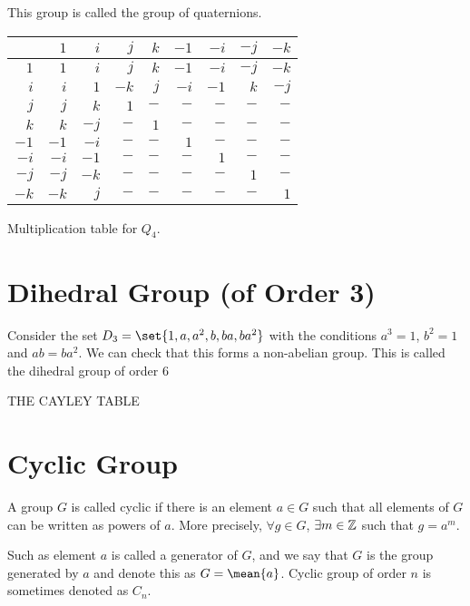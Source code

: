\documentclass[11pt]{penrose}
\newcommand{\cyclic}[1]{\mean{#1}}
\newcommand{\missing}[1]{{\color{red}#1}}
\begin{document}
This group is called the group of quaternions.
\begin{center}
    \begin{tabularx}{0.62\textwidth}{|R|R|R|R|R|R|R|R|R|}
        \hline
             & $ 1$ & $ i$ & $ j$ & $ k$ & $-1$ & $-i$ & $-j$ & $-k$ \\ \hline
        $ 1$ & $ 1$ & $ i$ & $ j$ & $ k$ & $-1$ & $-i$ & $-j$ & $-k$ \\ \hline
        $ i$ & $ i$ & $ 1$ & $-k$ & $ j$ & $-i$ & $-1$ & $ k$ & $-j$ \\ \hline
        $ j$ & $ j$ & $ k$ & $ 1$ & $ -$ & $ -$ & $ -$ & $ -$ & $ -$ \\ \hline
        $ k$ & $ k$ & $-j$ & $ -$ & $ 1$ & $ -$ & $ -$ & $ -$ & $ -$ \\ \hline
        $-1$ & $-1$ & $-i$ & $ -$ & $ -$ & $ 1$ & $ -$ & $ -$ & $ -$ \\ \hline
        $-i$ & $-i$ & $-1$ & $ -$ & $ -$ & $ -$ & $ 1$ & $ -$ & $ -$ \\ \hline
        $-j$ & $-j$ & $-k$ & $ -$ & $ -$ & $ -$ & $ -$ & $ 1$ & $ -$ \\ \hline
        $-k$ & $-k$ & $ j$ & $ -$ & $ -$ & $ -$ & $ -$ & $ -$ & $ 1$ \\ \hline
    \end{tabularx}

    {Multiplication table for $Q_4$.}
\end{center}

\section{Dihedral Group (of Order 3)}
Consider the set $D_3  =\set{1, a, a^2, b, ba, ba^2}$ with the conditions $a^3 = 1$, $b^2 = 1$ and $ab = ba^2$. We can check that this forms a non-abelian group. This is called the dihedral group of order $6$

\missing{
THE CAYLEY TABLE
}

\section{Cyclic Group}
\begin{ndfn}
    A group $G$ is called cyclic if there is an element $a \in G$ such that all elements of $G$ can be written as powers of $a$. More precisely, $\forall g \in G$, $\exists m \in \mathbb{Z}$ such that $g = a^m$.

    Such as element $a$ is called a generator of $G$, and we say that $G$ is the group generated by $a$ and denote this as $G = \cyclic{a}$. Cyclic group of order $n$ is sometimes denoted as $C_n$.
\end{ndfn}
\end{document}
